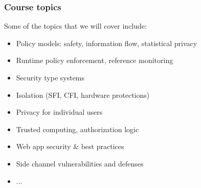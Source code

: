 \documentclass[10pt]{beamer}
\begin{document}








\begin{frame}

\frametitle{Course topics}

Some of the topics that we will cover include:
\begin{itemize}
  \item Policy models: safety, information flow, statistical privacy
  \item Runtime policy enforcement, reference monitoring
  \item Security type systems
  \item Isolation (SFI, CFI, hardware protections)
  \item Privacy for individual users
  \item Trusted computing, authorization logic
  \item Web app security \& best practices
  \item Side channel vulnerabilities and defenses
  \item ...
\end{itemize}

\end{frame}
\end{document}
